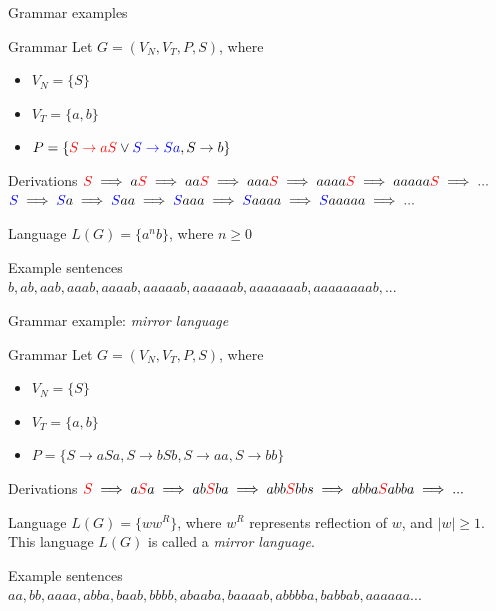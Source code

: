 \documentclass{beamer}
\begin{document}
\begin{frame}{Grammar examples}
	\begin{block}{Grammar}
		Let $G = (V_N, V_T, P, S)$, where 
		\begin{itemize}
			\item $V_N = \{S\}$
			\item $V_T = \{a,b\}$
			\item $P = \{\textcolor{red}{S \rightarrow aS} \lor \textcolor{blue}{S \rightarrow Sa}, S \rightarrow b\}$
		\end{itemize}
	\end{block}
	
	\begin{block}{Derivations}
		$\textcolor{red}{S}\implies a\textcolor{red}{S}\implies aa\textcolor{red}{S} \implies aaa\textcolor{red}{S} \implies aaaa\textcolor{red}{S} \implies aaaaa\textcolor{red}{S} \implies ...$
		\\ $\textcolor{blue}{S}\implies \textcolor{blue}{S}a\implies \textcolor{blue}{S}aa \implies \textcolor{blue}{S}aaa \implies \textcolor{blue}{S}aaaa \implies \textcolor{blue}{S}aaaaa \implies ...$
	\end{block}
	
	\begin{block}{Language}
		$L(G) = \{a^{n}b\}$, where $n \geq 0$
	\end{block}
	
	\begin{exampleblock}{Example sentences}
		$b, ab, aab, aaab, aaaab, aaaaab, aaaaaab, aaaaaaab, aaaaaaaab, ...$
	\end{exampleblock}
\end{frame}

\begin{frame}{Grammar example: \textit{mirror language}}
	\begin{block}{Grammar}
		Let $G = (V_N, V_T, P, S)$, where 
		\begin{itemize}
			\item $V_N = \{S\}$
			\item $V_T = \{a,b\}$
			\item $P = \{S \rightarrow aSa, S \rightarrow bSb, S \rightarrow aa, S \rightarrow bb\}$
		\end{itemize}
	\end{block}
	
	\begin{block}{Derivations}
		$\textcolor{red}{S}\implies a\textcolor{red}{S}a \implies ab\textcolor{red}{S}ba \implies abb\textcolor{red}{S}bbs \implies abba\textcolor{red}{S}abba \implies ...$
	\end{block}
	
	\begin{block}{Language}
		$L(G) = \{ww^R\}$, where $w^R$ represents reflection of $w$, and $|w|\geq1$. This language $L(G)$ is called a \textit{mirror language}.
	\end{block}
	
	\begin{exampleblock}{Example sentences}
		$aa, bb, aaaa, abba, baab, bbbb, abaaba, baaaab, abbbba, babbab, aaaaaa...$
	\end{exampleblock}
\end{frame}
\end{document}
